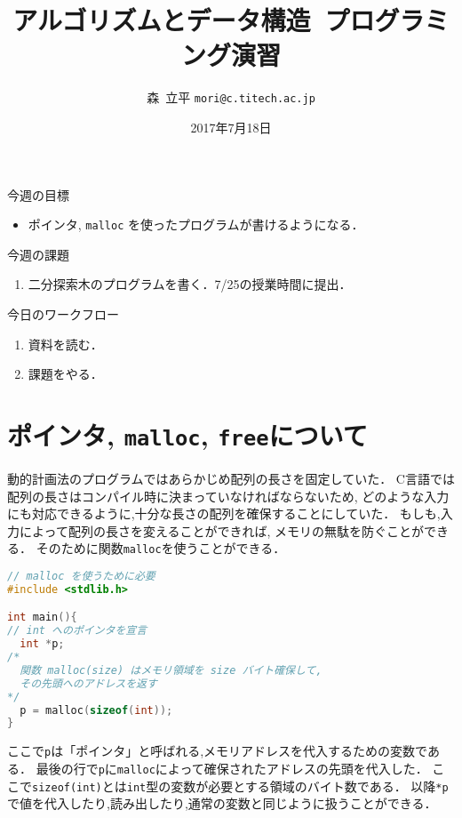 \documentclass[a4paper,twoside,onecolumn,openany,article]{memoir}
\title{アルゴリズムとデータ構造~プログラミング演習}
\date{2017年7月18日}
\author{森~立平 \texttt{mori@c.titech.ac.jp}}
\theoremstyle{remark}
\begin{document}
\maketitle

\noindent
今週の目標
\begin{itemize}
\item ポインタ, \texttt{malloc} を使ったプログラムが書けるようになる．
\end{itemize}

\noindent
今週の課題
\begin{enumerate}
\item 二分探索木のプログラムを書く．7/25の授業時間に提出．
\end{enumerate}

\vspace{.5em}
\noindent
今日のワークフロー
\begin{enumerate}
\item 資料を読む．
\item 課題をやる．
\end{enumerate}

\section{ポインタ, \texttt{malloc}, \texttt{free}について}
動的計画法のプログラムではあらかじめ配列の長さを固定していた．
C言語では配列の長さはコンパイル時に決まっていなければならないため,
どのような入力にも対応できるように,十分な長さの配列を確保することにしていた．
もしも,入力によって配列の長さを変えることができれば,
メモリの無駄を防ぐことができる．
そのために関数\texttt{malloc}を使うことができる．

\begin{lstlisting}[basicstyle=\ttfamily\small,showstringspaces=false,language=C,frame=single]
// malloc を使うために必要
#include <stdlib.h>

int main(){
// int へのポインタを宣言
  int *p;
/*
  関数 malloc(size) はメモリ領域を size バイト確保して,
  その先頭へのアドレスを返す
*/
  p = malloc(sizeof(int));
}
\end{lstlisting}
ここで\texttt{p}は「ポインタ」と呼ばれる,メモリアドレスを代入するための変数である．
最後の行で\texttt{p}に\texttt{malloc}によって確保されたアドレスの先頭を代入した．
ここで\texttt{sizeof(int)}とは\texttt{int}型の変数が必要とする領域のバイト数である．
以降\texttt{*p}で値を代入したり,読み出したり,通常の変数と同じように扱うことができる．
\end{document}
